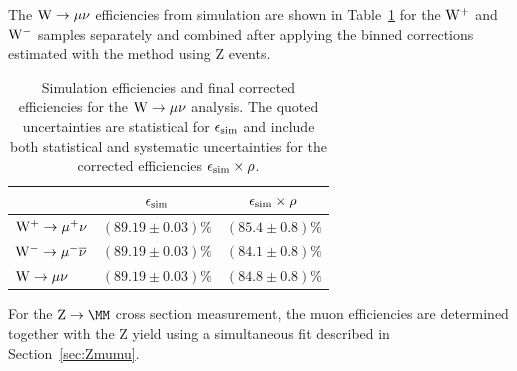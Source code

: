 The $\mathrm{W} \rightarrow \mu\nu$ efficiencies from simulation are shown in Table~\ref{tab:mu-MCeff} for the $\mathrm{W^+}$ and $\mathrm{W^-}$ samples separately
and combined after applying the binned corrections estimated with the \TNP method using Z events.


\begin{table}[ht] %
  \begin{center}
  \caption{Simulation efficiencies and final corrected efficiencies for the $\mathrm{W} \rightarrow \mu\nu$ analysis.
The quoted uncertainties are statistical for $\epsilon_{\mathrm{sim}}$ and include both statistical and systematic uncertainties
for the corrected efficiencies $\epsilon_{\mathrm{sim}} \times \rho$.
  \label{tab:mu-MCeff}}
  \begin{tabular}{|l|c|c|}
    \hline
   & $\epsilon_{\mathrm{sim}}$ & $\epsilon_{\mathrm{sim}} \times \rho$ \\
    \hline\hline
 $\mathrm{W^+} \rightarrow \mu^+\nu$   & $(89.19\pm 0.03)\%$ & $(85.4\pm 0.8)\%$ \\
 $\mathrm{W^-} \rightarrow \mu^-\overline{\nu}$   & $(89.19\pm 0.03)\%$ & $(84.1\pm 0.8)\%$ \\
 $\mathrm{W} \rightarrow \mu\nu$  & $(89.19\pm 0.03)\%$ & $(84.8\pm 0.8)\%$ \\
    \hline
    \end{tabular}
  \end{center}
\end{table}



For the $\Zmm$ cross section measurement, the muon efficiencies are determined together with the Z yield using 
a simultaneous fit described in Section~\ref{sec:Zmumu}.

